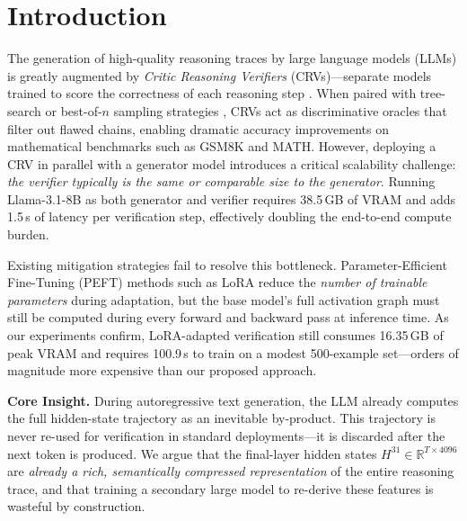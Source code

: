 \documentclass{article}
\begin{document}
\section{Introduction}
\label{sec:intro}

The generation of high-quality reasoning traces by large language models (LLMs) is greatly augmented by \emph{Critic Reasoning Verifiers} (CRVs)---separate models trained to score the correctness of each reasoning step \citep{lightman2023lets, cobbe2021training}. When paired with tree-search or best-of-$n$ sampling strategies \citep{snell2024scaling}, CRVs act as discriminative oracles that filter out flawed chains, enabling dramatic accuracy improvements on mathematical benchmarks such as GSM8K and MATH. However, deploying a CRV in parallel with a generator model introduces a critical scalability challenge: \emph{the verifier typically is the same or comparable size to the generator}. Running Llama-3.1-8B \citep{llama3_1} as both generator and verifier requires 38.5\,GB of VRAM and adds 1.5\,s of latency per verification step, effectively doubling the end-to-end compute burden.

Existing mitigation strategies fail to resolve this bottleneck. Parameter-Efficient Fine-Tuning (PEFT) methods such as LoRA \citep{hu2021lora} reduce the \emph{number of trainable parameters} during adaptation, but the base model's full activation graph must still be computed during every forward and backward pass at inference time. As our experiments confirm, LoRA-adapted verification still consumes 16.35\,GB of peak VRAM and requires 100.9\,s to train on a modest 500-example set---orders of magnitude more expensive than our proposed approach.

\textbf{Core Insight.} During autoregressive text generation, the LLM already computes the full hidden-state trajectory as an inevitable by-product. This trajectory is never re-used for verification in standard deployments---it is discarded after the next token is produced. We argue that the final-layer hidden states $H^{31} \in \mathbb{R}^{T \times 4096}$ are \emph{already a rich, semantically compressed representation} of the entire reasoning trace, and that training a secondary large model to re-derive these features is wasteful by construction.
\end{document}
